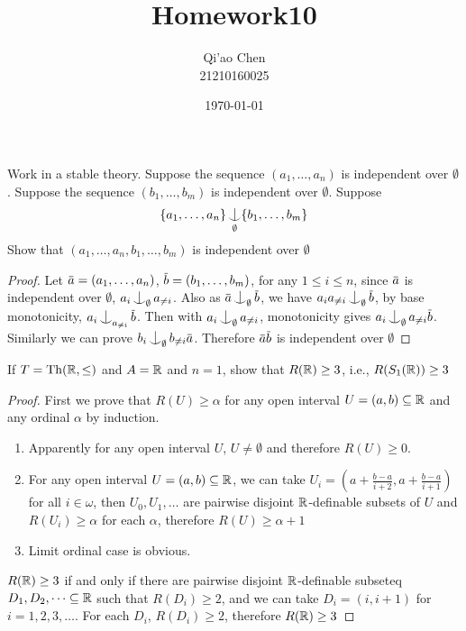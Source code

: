 \documentclass[11pt]{article}
\author{Qi'ao Chen\\21210160025}
\date{\today}
\title{Homework10}
\begin{document}
\maketitle
\begin{exercise}
Work in a stable theory. Suppose the sequence \((a_1,\dots,a_n)\) is independent over \(\emptyset\). Suppose the
sequence \((b_1,\dots,b_m)\) is independent over \(\emptyset\). Suppose
\begin{equation*}
\{a_1,\dots,a_n\}\ind_\emptyset\{b_1,\dots,b_m\}
\end{equation*}
Show that \((a_1,\dots,a_n,b_1,\dots,b_m)\) is independent over \(\emptyset\)
\end{exercise}

\begin{proof}
Let \(\bara=(a_1,\dots,a_n)\), \(\barb=(b_1,\dots,b_m)\), for any \(1\le i\le n\), since \(\bara\) is independent
over \(\emptyset\), \(a_i\ind_\emptyset a_{\neq i}\).
Also as \(\bara\ind_\emptyset\barb\), we have \(a_ia_{\neq i}\ind_\emptyset\barb\), by base
monotonicity, \(a_i\ind_{a_{\neq i}}\barb\). Then with \(a_i\ind_\emptyset a_{\neq i}\), monotonicity
gives \(a_i\ind_{\emptyset}a_{\neq i}\barb\). Similarly we can prove \(b_i\ind_{\emptyset}b_{\neq i}\bara\).
Therefore \(\bara\barb\) is independent over \(\emptyset\)
\end{proof}

\begin{exercise}
If \(T=\operatorname{Th}(\mathbb{R},\le)\) and \(A=\mathbb{R}\) and \(n=1\), show that \(R(\mathbb{R})\ge 3\), i.e., \(R(S_1(\mathbb{R}))\ge 3\)
\end{exercise}

\begin{proof}
First we prove that \(R(U)\ge\alpha\) for any open interval \(U=(a,b)\subseteq\mathbb{R}\) and any ordinal \(\alpha\) by induction.

\begin{enumerate}
\item Apparently for any open interval \(U\), \(U\neq\emptyset\) and therefore \(R(U)\ge 0\).
\item For any open interval \(U=(a,b)\subseteq\mathbb{R}\), we can take \(U_i=(a+\frac{b-a}{i+2},a+\frac{b-a}{i+1})\) for
all \(i\in\omega\), then \(U_0,U_1,\dots\) are pairwise disjoint \(\mathbb{R}\)-definable subsets of \(U\) and
\(R(U_i)\ge\alpha\) for each \(\alpha\), therefore \(R(U)\ge\alpha+1\)
\item Limit ordinal case is obvious.
\end{enumerate}


\(R(\mathbb{R})\ge 3\) if and only if there are pairwise disjoint \(\mathbb{R}\)-definable subseteq \(D_1,D_2,\dots\subseteq\mathbb{R}\) such
that \(R(D_i)\ge 2\), and we can take \(D_i=(i,i+1)\) for \(i=1,2,3,\dots\). For each \(D_i\), \(R(D_i)\ge 2\),
therefore \(R(\mathbb{R})\ge 3\)
\end{proof}
\end{document}
